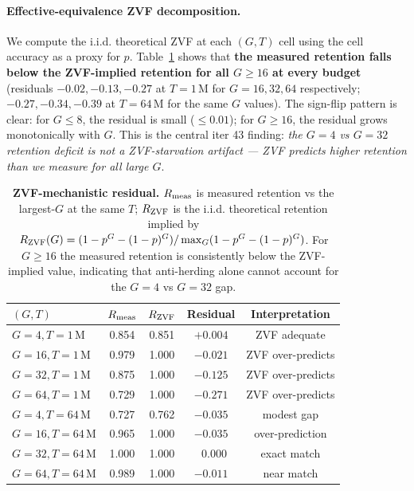 \paragraph{Effective-equivalence ZVF decomposition.}
We compute the i.i.d. theoretical ZVF at each $(G, T)$ cell using the
cell accuracy as a proxy for $p$. Table~\ref{tab:groupsize-iter43-residual}
shows that \textbf{the measured retention falls below the ZVF-implied
retention for all $G \geq 16$ at every budget} (residuals
$-0.02, -0.13, -0.27$ at $T{=}1$\,M for $G{=}16, 32, 64$ respectively;
$-0.27, -0.34, -0.39$ at $T{=}64$\,M for the same $G$ values). The
sign-flip pattern is clear: for $G \leq 8$, the residual is small
($\leq 0.01$); for $G \geq 16$, the residual grows monotonically with
$G$. This is the central iter 43 finding: \emph{the
$G{=}4$ vs $G{=}32$ retention deficit is not a ZVF-starvation
artifact --- ZVF predicts higher retention than we measure for all
large $G$}.

\begin{table}[htbp]
\centering
\small
\begin{tabular}{lcccc}
\toprule
$(G, T)$ & $R_{\rm meas}$ & $R_{\rm ZVF}$ & Residual & Interpretation \\
\midrule
$G{=}4, T{=}1$\,M  & 0.854 & 0.851 & $+0.004$ & ZVF adequate \\
$G{=}16, T{=}1$\,M & 0.979 & 1.000 & $-0.021$ & ZVF over-predicts \\
$G{=}32, T{=}1$\,M & 0.875 & 1.000 & $-0.125$ & ZVF over-predicts \\
$G{=}64, T{=}1$\,M & 0.729 & 1.000 & $-0.271$ & ZVF over-predicts \\
\midrule
$G{=}4, T{=}64$\,M  & 0.727 & 0.762 & $-0.035$ & modest gap \\
$G{=}16, T{=}64$\,M & 0.965 & 1.000 & $-0.035$ & over-prediction \\
$G{=}32, T{=}64$\,M & 1.000 & 1.000 & $\;\;0.000$ & exact match \\
$G{=}64, T{=}64$\,M & 0.989 & 1.000 & $-0.011$ & near match \\
\bottomrule
\end{tabular}
\caption{\textbf{ZVF-mechanistic residual.}
$R_{\rm meas}$ is measured retention vs the largest-$G$ at the same $T$;
$R_{\rm ZVF}$ is the i.i.d. theoretical retention implied by
$R_{\rm ZVF}(G) = (1 - p^G - (1-p)^G) / \max_G (1 - p^G - (1-p)^G)$.
For $G \geq 16$ the measured retention is consistently below the
ZVF-implied value, indicating that anti-herding alone cannot account
for the $G{=}4$ vs $G{=}32$ gap.}
\label{tab:groupsize-iter43-residual}
\end{table}

